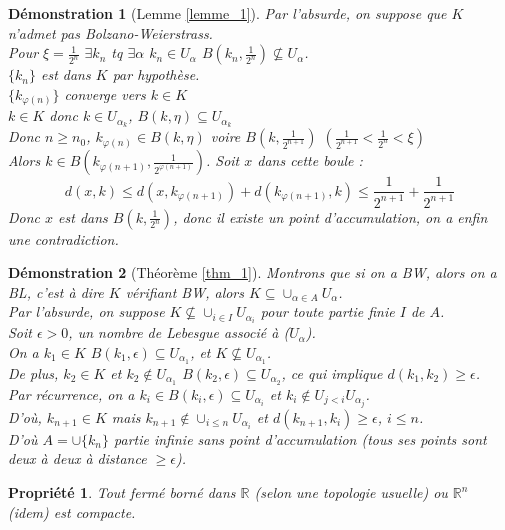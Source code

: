 \documentclass[a4paper, oneside]{report}
\theoremstyle{break}
\newtheorem{propr}[thm]{Propriété}
\newtheorem*{demo}{Démonstration}
\newcommand{\R}{\mathbb{R}}
\newcommand{\fracun}[1]{\frac{1}{#1}}
\begin{document}
\begin{demo}[Lemme \ref{lemme_1}]
Par l'absurde, on suppose que $K$ n'admet pas Bolzano-Weierstrass.\\
Pour $\xi = \fracun{2^n}$ $\exists k_n$ tq $\exists \alpha$ $k_n \in U_\alpha $ $B(k_n, \fracun{2^n}) \nsubseteq U_\alpha$.\\
$\{k_n\}$ est dans $K$ par hypothèse.\\
$\{k_{\varphi(n)}\}$ converge vers $k\in K$\\
$k\in K$ donc $k\in U_{\alpha_k}$, $B(k,\eta) \subseteq U_{\alpha_k}$\\
Donc $n\geq n_0$, $k_{\varphi(n)} \in B(k,\eta)$ voire $B(k,\fracun{2^{n+1}})$ $(\fracun{2^{n+1}} < \fracun{2^n}< \xi)$\\
Alors $k\in B(k_{\varphi(n+1)}, \fracun{2^{\varphi (n+1)}})$. Soit $x$ dans cette boule :
$$d(x,k) \leq d(x,k_{\varphi (n+1)}) + d(k_{\varphi (n+1)}, k) \leq \fracun{2^{n+1}} + \fracun{2^{n+1}}$$
Donc $x$ est dans $B(k,\fracun{2^n})$, donc il existe un point d'accumulation, on a enfin une contradiction.
\end{demo}


\begin{demo}[Théorème \ref{thm_1}]
Montrons que si on a BW, alors on a BL, c'est à dire $K$ vérifiant BW, alors $K\subseteq \cup_{\alpha \in A} U_\alpha$.\\
Par l'absurde, on suppose $K \nsubseteq \cup_{i\in I} U_{\alpha_i}$ pour toute partie finie $I$ de $A$.\\
Soit $\epsilon >0$, un nombre de Lebesgue associé à ($U_\alpha$).\\
On a $k_1\in K$ $B(k_1,\epsilon) \subseteq U_{\alpha_1}$, et $K\nsubseteq U_{\alpha_1}$.\\
De plus, $k_2\in K$ et $k_2\notin U_{\alpha_1}$ $B(k_2,\epsilon) \subseteq U_{\alpha_2}$, ce qui implique $d(k_1,k_2)\geq \epsilon$.\\
Par récurrence, on a $k_i\in B(k_i,\epsilon)\subseteq U_{\alpha_i}$ et $k_i\notin U_{j<i}U_{\alpha_j}$.\\
D'où, $k_{n+1}\in K$ mais $k_{n+1}\notin \cup_{i\leq n}U_{\alpha_i}$ et $d(k_{n+1}, k_i)\geq \epsilon$, $i\leq n$.\\
D'où $A=\cup \{k_n\}$ partie infinie sans point d'accumulation (tous ses points sont deux à deux à distance $\geq \epsilon$).
\end{demo}



\begin{propr}
Tout fermé borné dans $\R$ (selon une topologie usuelle) ou $\R^n$ (idem) est compacte.
\end{propr}
\end{document}
